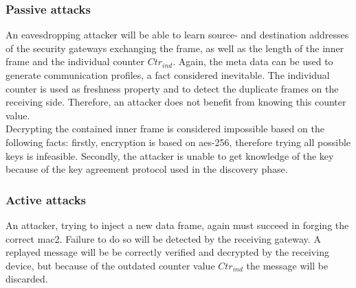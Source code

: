 \subsubsection{Passive attacks}
An eavesdropping attacker will be able to learn source- and destination addresses of the security gateways exchanging the frame, as well as the length of the inner frame and the
individual counter $Ctr_{ind}$. Again, the meta data can be used to generate communication profiles, a fact considered inevitable. The individual counter is used as freshness property
and to detect the duplicate frames on the receiving side. Therefore, an attacker does not benefit from knowing this counter value.
\\
Decrypting the contained inner frame is considered impossible based on the following facts: firstly, encryption is based on \gls{aes}-256, therefore trying all possible keys is infeasible.
Secondly, the attacker is unable to get knowledge of the key because of the key agreement protocol used in the discovery phase.
\subsubsection{Active attacks}
An attacker, trying to inject a new data frame, again must succeed in forging the correct \gls{mac2}. Failure to do so will be detected by the receiving gateway.
A replayed message will be be correctly verified and decrypted by the receiving device, but because of the outdated counter value $Ctr_{ind}$ the message will be discarded.

 
